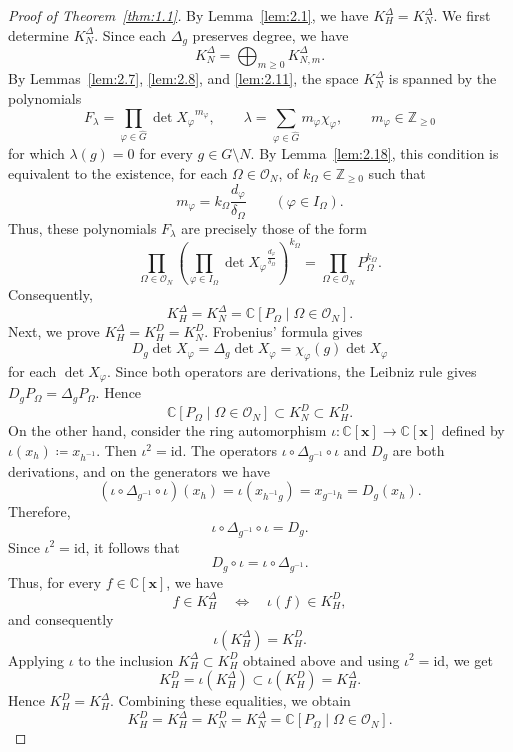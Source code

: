 \documentclass[12pt,a4paper]{article}
\theoremstyle{definition}
\numberwithin{definition}{section}
\begin{document}
\begin{proof}[Proof of Theorem~\ref{thm:1.1}]
By Lemma~\ref{lem:2.1}, we have $K_H^\Delta=K_N^\Delta$.
We first determine $K_N^\Delta$.
Since each $\Delta_g$ preserves degree, we have
\[
K_N^\Delta=\bigoplus_{m\ge0}K_{N,m}^\Delta.
\]
By Lemmas~\ref{lem:2.7}, \ref{lem:2.8}, and \ref{lem:2.11}, the space $K_N^\Delta$ is spanned by the polynomials
\[
F_{\lambda} = \prod_{\varphi \in \widehat{G}}
\det{X_\varphi}^{m_\varphi},
\qquad
\lambda=\sum_{\varphi\in\widehat G}m_\varphi\chi_\varphi,
\qquad
m_\varphi\in\mathbb Z_{\geq 0}
\]
for which $\lambda(g) = 0$ for every $g\in G \setminus N$.
By Lemma~\ref{lem:2.18}, this condition is equivalent to the existence,
for each $\Omega\in\mathcal O_N$, of $k_\Omega\in\mathbb Z_{\geq 0}$ such that
\[
m_\varphi=k_\Omega\frac{d_\varphi}{\delta_\Omega}
\qquad(\varphi\in I_\Omega).
\]
Thus, these polynomials $F_\lambda$ are precisely those of the form
\[
\prod_{\Omega\in\mathcal O_N}
\left(
  \prod_{\varphi\in I_\Omega}
  \det{X_\varphi}^{\frac{d_\varphi}{\delta_\Omega}}
\right)^{k_\Omega}
=
\prod_{\Omega \in \mathcal{O}_{N}} P_{\Omega}^{k_{\Omega}}.
\]
Consequently,
\[
K_H^\Delta=K_N^\Delta
=\mathbb C[P_\Omega\mid\Omega\in\mathcal O_N].
\]
Next, we prove $K_{H}^{\Delta} = K_{H}^{D} = K_{N}^{D}$.
Frobenius' formula gives
\[
D_g \det{X_\varphi} = \Delta_g \det{X_\varphi}
=\chi_\varphi(g) \det{X_\varphi}
\]
for each $\det{X_\varphi}$.
Since both operators are derivations, the Leibniz rule gives $D_gP_\Omega=\Delta_gP_\Omega$.
Hence
\[
\mathbb C[P_\Omega\mid\Omega\in\mathcal O_N]
\subset K_N^D\subset K_H^D.
\]
On the other hand, consider the ring automorphism $\iota \colon \mathbb{C}[\bm{x}] \to \mathbb{C}[\bm{x}]$
defined by $\iota(x_h)\coloneqq x_{h^{-1}}$.
Then $\iota^2=\mathrm{id}$.
The operators $\iota\circ\Delta_{g^{-1}}\circ\iota$ and $D_g$ are both derivations,
and on the generators we have
\[
(\iota\circ\Delta_{g^{-1}}\circ\iota)(x_h)
=\iota(x_{h^{-1}g})
=x_{g^{-1}h}
=D_g(x_h).
\]
Therefore,
\[
\iota\circ\Delta_{g^{-1}}\circ\iota=D_g.
\]
Since $\iota^2=\mathrm{id}$, it follows that
\[
D_g\circ\iota=\iota\circ\Delta_{g^{-1}}.
\]
Thus, for every $f\in\mathbb C[\bm{x}]$, we have
\[
f\in K_H^\Delta
\quad\Longleftrightarrow\quad
\iota(f)\in K_H^D,
\]
and consequently
\[
\iota(K_H^\Delta)=K_H^D.
\]
Applying $\iota$ to the inclusion $K_H^\Delta \subset K_H^D$ obtained above
and using $\iota^2 = \mathrm{id}$, we get
\[
K_H^D
=\iota(K_H^\Delta)
\subset \iota(K_H^D)
=K_H^\Delta.
\]
Hence $K_H^D=K_H^\Delta$.
Combining these equalities, we obtain
\[
K_H^D=K_H^\Delta=K_N^D=K_N^\Delta
=\mathbb C[P_\Omega\mid\Omega\in\mathcal O_N].
\]
\end{proof}
\end{document}
